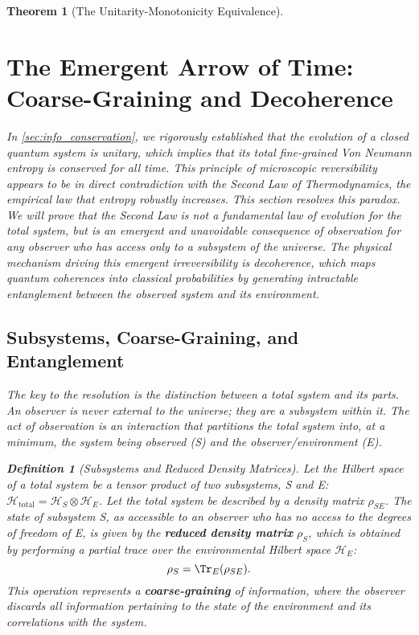 \documentclass[11pt, letterpaper]{report}
\theoremstyle{plain} %
\newtheorem{theorem}{Theorem}[chapter]
\theoremstyle{definition} %
\newtheorem{definition}{Definition}[chapter]
\theoremstyle{remark} %
\begin{document}
\begin{theorem}[The Unitarity-Monotonicity Equivalence]
\section{The Emergent Arrow of Time: Coarse-Graining and Decoherence}
\label{sec:emergent_arrow}

In \cref{sec:info_conservation}, we rigorously established that the evolution of a closed quantum system is unitary, which implies that its total fine-grained Von Neumann entropy is conserved for all time. This principle of microscopic reversibility appears to be in direct contradiction with the Second Law of Thermodynamics, the empirical law that entropy robustly increases. This section resolves this paradox. We will prove that the Second Law is not a fundamental law of evolution for the total system, but is an emergent and unavoidable consequence of observation for any observer who has access only to a subsystem of the universe. The physical mechanism driving this emergent irreversibility is decoherence, which maps quantum coherences into classical probabilities by generating intractable entanglement between the observed system and its environment.

\subsection{Subsystems, Coarse-Graining, and Entanglement}
The key to the resolution is the distinction between a total system and its parts. An observer is never external to the universe; they are a subsystem within it. The act of observation is an interaction that partitions the total system into, at a minimum, the system being observed (S) and the observer/environment (E).

\begin{definition}[Subsystems and Reduced Density Matrices]
Let the Hilbert space of a total system be a tensor product of two subsystems, S and E: $\mathcal{H}_{\text{total}} = \mathcal{H}_S \otimes \mathcal{H}_E$. Let the total system be described by a density matrix $\rho_{SE}$. The state of subsystem S, as accessible to an observer who has no access to the degrees of freedom of E, is given by the \textbf{reduced density matrix} $\rho_S$, which is obtained by performing a partial trace over the environmental Hilbert space $\mathcal{H}_E$:
\begin{equation}
    \rho_S = \Tr_E(\rho_{SE}).
    \label{eq:reduced_density_matrix}
\end{equation}
This operation represents a \textbf{coarse-graining} of information, where the observer discards all information pertaining to the state of the environment and its correlations with the system.
\end{definition}


\end{theorem}
\end{document}
